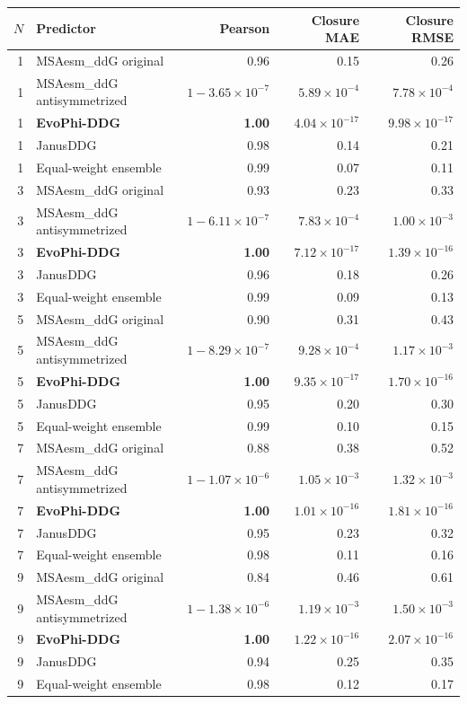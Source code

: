 \begin{tabular}{rlrrr}\toprule $N$ & Predictor & Pearson & Closure MAE & Closure RMSE\\\midrule
1 & MSAesm\_ddG original & 0.96 & 0.15 & 0.26 \\
1 & MSAesm\_ddG antisymmetrized & $1-3.65\times10^{-7}$ & $5.89\times10^{-4}$ & $7.78\times10^{-4}$ \\
1 & \textbf{EvoPhi-DDG} & \textbf{1.00} & \textbf{\boldmath $4.04\times10^{-17}$} & \textbf{\boldmath $9.98\times10^{-17}$} \\
1 & JanusDDG & 0.98 & 0.14 & 0.21 \\
1 & Equal-weight ensemble & 0.99 & 0.07 & 0.11 \\
3 & MSAesm\_ddG original & 0.93 & 0.23 & 0.33 \\
3 & MSAesm\_ddG antisymmetrized & $1-6.11\times10^{-7}$ & $7.83\times10^{-4}$ & $1.00\times10^{-3}$ \\
3 & \textbf{EvoPhi-DDG} & \textbf{1.00} & \textbf{\boldmath $7.12\times10^{-17}$} & \textbf{\boldmath $1.39\times10^{-16}$} \\
3 & JanusDDG & 0.96 & 0.18 & 0.26 \\
3 & Equal-weight ensemble & 0.99 & 0.09 & 0.13 \\
5 & MSAesm\_ddG original & 0.90 & 0.31 & 0.43 \\
5 & MSAesm\_ddG antisymmetrized & $1-8.29\times10^{-7}$ & $9.28\times10^{-4}$ & $1.17\times10^{-3}$ \\
5 & \textbf{EvoPhi-DDG} & \textbf{1.00} & \textbf{\boldmath $9.35\times10^{-17}$} & \textbf{\boldmath $1.70\times10^{-16}$} \\
5 & JanusDDG & 0.95 & 0.20 & 0.30 \\
5 & Equal-weight ensemble & 0.99 & 0.10 & 0.15 \\
7 & MSAesm\_ddG original & 0.88 & 0.38 & 0.52 \\
7 & MSAesm\_ddG antisymmetrized & $1-1.07\times10^{-6}$ & $1.05\times10^{-3}$ & $1.32\times10^{-3}$ \\
7 & \textbf{EvoPhi-DDG} & \textbf{1.00} & \textbf{\boldmath $1.01\times10^{-16}$} & \textbf{\boldmath $1.81\times10^{-16}$} \\
7 & JanusDDG & 0.95 & 0.23 & 0.32 \\
7 & Equal-weight ensemble & 0.98 & 0.11 & 0.16 \\
9 & MSAesm\_ddG original & 0.84 & 0.46 & 0.61 \\
9 & MSAesm\_ddG antisymmetrized & $1-1.38\times10^{-6}$ & $1.19\times10^{-3}$ & $1.50\times10^{-3}$ \\
9 & \textbf{EvoPhi-DDG} & \textbf{1.00} & \textbf{\boldmath $1.22\times10^{-16}$} & \textbf{\boldmath $2.07\times10^{-16}$} \\
9 & JanusDDG & 0.94 & 0.25 & 0.35 \\
9 & Equal-weight ensemble & 0.98 & 0.12 & 0.17 \\
\bottomrule\end{tabular}
